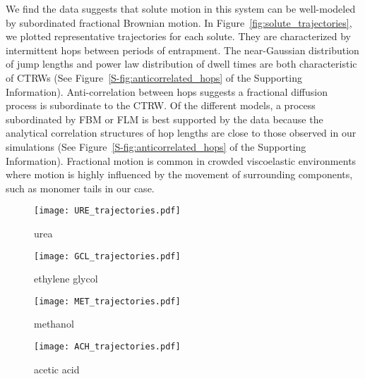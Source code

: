 \documentclass[journal=ancac3,manuscript=article,layout=twocolumn]{achemso}
\begin{document}
  We find the data suggests that solute motion in this system can be
  well-modeled by subordinated fractional Brownian motion. In
  Figure~\ref{fig:solute_trajectories}, we plotted representative trajectories
  for each solute. They are characterized by intermittent hops between periods
  of entrapment. The near-Gaussian distribution of jump lengths and power law
  distribution of dwell times are both characteristic of CTRWs
  (See Figure~\ref{S-fig:anticorrelated_hops} of the Supporting Information). 
  Anti-correlation between hops suggests a fractional diffusion process is 
  subordinate to the CTRW. Of the different models, a process subordinated by 
  FBM or FLM is best supported by the data because the analytical correlation 
  structures of hop lengths are close to those observed in our simulations 
  (See Figure~\ref{S-fig:anticorrelated_hops} of the Supporting Information). Fractional 
  motion is common in crowded viscoelastic environments where motion is highly
  influenced by the movement of surrounding components, such as monomer tails 
  in our case.~\cite{ernst_fractional_2012}
  
  \begin{figure*}
  \centering
  \begin{subfigure}{0.45\textwidth}
  \texttt{[image: URE\_trajectories.pdf]}
  \caption{urea}\label{fig:URE_trajectories}
  \end{subfigure}
  \begin{subfigure}{0.45\textwidth}
  \texttt{[image: GCL\_trajectories.pdf]}
  \caption{ethylene glycol}\label{fig:GCL_trajectories}
  \end{subfigure}
  \begin{subfigure}{0.45\textwidth}
  \texttt{[image: MET\_trajectories.pdf]}
  \caption{methanol}\label{fig:MET_trajectories}
  \end{subfigure}
  \begin{subfigure}{0.45\textwidth}
  \texttt{[image: ACH\_trajectories.pdf]}
  \caption{acetic acid}\label{fig:ACH_trajectories}
  \end{subfigure}
  \caption{Three representative trajectories generated from each solute exhibit hops
	  between periods of entrapment, characteristic of a CTRW. Solute
	  dynamics show radial dependence, represented by the color at each
	  time point. The longest periods of entrapment typically occur when
	  solutes drift far from the pore center and into the tails.
  }\label{fig:solute_trajectories}
  \end{figure*}
  
\end{document}
